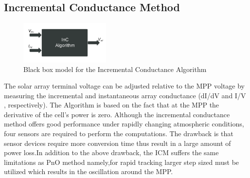 {  \subsection{Incremental Conductance Method }
  
  \begin{figure}[H]
         \begin{center}
         \includegraphics[width=0.4\textwidth]{images/inC_block}
         \caption{ Black box model for the Incremental Conductance Algorithm }
         \label{fig:inC_block}
    \end{center}
  \end{figure}
  
  The  solar array terminal  voltage  can  be  adjusted relative to the MPP voltage by measuring the incremental and instantaneous  array  conductance (dI/dV and I/V ,   respectively). The Algorithm is based on the fact that at the \ac{MPP} the derivative of the cell's power is zero. Although  the  incremental  conductance method offers good performance under rapidly changing atmospheric  conditions,  four  sensors  are  required to   perform the  computations. The  drawback is that sensor devices require  more  conversion  time  thus  result in a large amount of power loss\cite{gomathy2012design}.In addition to the above drawback, the \ac{ICM} suffers the same limitations as \ac{PnO} method namely,for rapid tracking larger step sized must be utilized which results in the oscillation around the \ac{MPP}. \\
  
}
